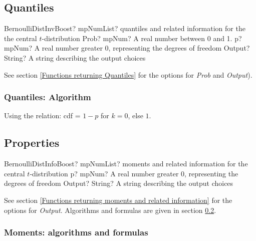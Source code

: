 \subsection{Quantiles}

\begin{mpFunctionsExtract}
	\mpFunctionThreeNotImplemented
	{BernoulliDistInvBoost? mpNumList? quantiles and related information for the the central $t$-distribution}
	{Prob? mpNum? A real number between 0 and 1.}
	{p? mpNum? A real number greater 0, representing the degrees of freedom}
	{Output? String? A string describing the output choices}
\end{mpFunctionsExtract}

See section \ref{Functions returning Quantiles} for the options for  {\itshape\sffamily Prob} and {\itshape\sffamily Output}). 

\subsubsection{Quantiles: Algorithm}
Using the relation: cdf = $1 - p$ for $k = 0$, else $1$.


\subsection{Properties}
\label{BernoulliDistributionProperties}


\begin{mpFunctionsExtract}
	\mpFunctionTwoNotImplemented
	{BernoulliDistInfoBoost? mpNumList? moments and related information for the central $t$-distribution}
	{p? mpNum? A real number greater 0, representing the degrees of freedom}
	{Output? String? A string describing the output choices}
\end{mpFunctionsExtract}

\vspace{0.3cm}

See section \ref{Functions returning moments and related information} for the options for {\itshape\sffamily Output}. Algorithms and formulas are given in section \ref{BernoulliDistributionProperties}.



\subsubsection{Moments: algorithms and formulas}

